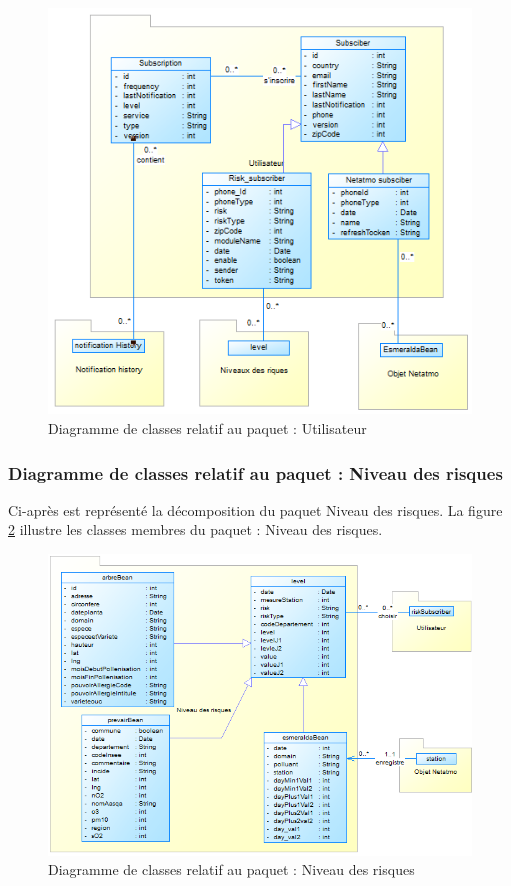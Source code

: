 \begin{figure}[!h]
	\begin{center}
		\includegraphics[width=0.64\textheight]{figures/pckg2}
	\end{center}
	\caption{Diagramme de classes relatif au paquet : Utilisateur}
	\label{fig3.4}
\end{figure}
\newpage
\subsubsection{Diagramme de classes relatif au paquet : Niveau des risques}

\qquad Ci-après est représenté la décomposition du paquet Niveau des risques. La figure \ref{fig3.5} illustre les classes membres du paquet : Niveau des risques.

\begin{figure}[!h]
	\begin{center}
		\includegraphics[width=0.64\textheight]{figures/pckg3}
	\end{center}
	\caption{Diagramme de classes relatif au paquet : Niveau des risques}
	\label{fig3.5}
\end{figure}

